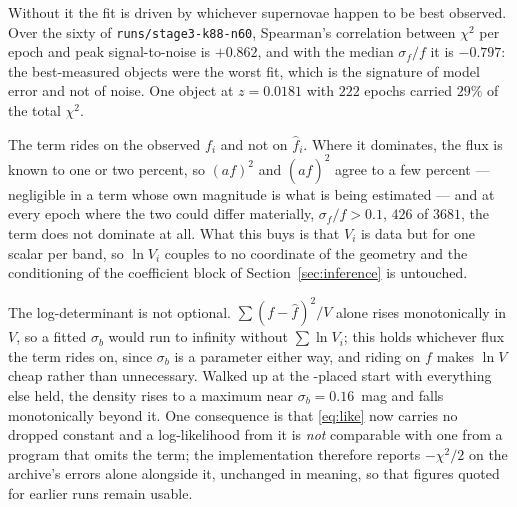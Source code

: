 \documentclass[11pt]{article}
\theoremstyle{plain}
\begin{document}
Without it the fit is driven by whichever supernovae happen to be best observed. Over the
sixty of \texttt{runs/stage3-k88-n60}, Spearman's correlation between $\chi^{2}$ per epoch
and peak signal-to-noise is $+0.862$, and with the median $\sigma_{f}/f$ it is $-0.797$:
the best-measured objects were the worst fit, which is the signature of model error and not
of noise. One object at $z = 0.0181$ with $222$ epochs carried $29\%$ of the total
$\chi^{2}$.

The term rides on the observed $f_{i}$ and not on $\hat f_{i}$. Where it dominates, the
flux is known to one or two percent, so $(a f)^{2}$ and $(a\hat f)^{2}$ agree to a few
percent --- negligible in a term whose own magnitude is what is being estimated --- and at
every epoch where the two could differ materially, $\sigma_{f}/f > 0.1$, $426$ of $3681$,
the term does not dominate at all. What this buys is that $V_{i}$ is data but for one
scalar per band, so $\ln V_{i}$ couples to no coordinate of the geometry and the
conditioning of the coefficient block of Section~\ref{sec:inference} is untouched.

The log-determinant is not optional. $\sum (f-\hat f)^{2}/V$ alone rises monotonically in
$V$, so a fitted $\sigma_{b}$ would run to infinity without $\sum\ln V_{i}$; this holds
whichever flux the term rides on, since $\sigma_{b}$ is a parameter either way, and riding
on $f$ makes $\ln V$ cheap rather than unnecessary. Walked up at the \salt-placed start
with everything else held, the density rises to a maximum near $\sigma_{b} = 0.16$~mag and
falls monotonically beyond it. One consequence is that \eqref{eq:like} now carries no
dropped constant and a log-likelihood from it is \emph{not} comparable with one from a
program that omits the term; the implementation therefore reports $-\chi^{2}/2$ on the
archive's errors alone alongside it, unchanged in meaning, so that figures quoted for
earlier runs remain usable.
\end{document}
